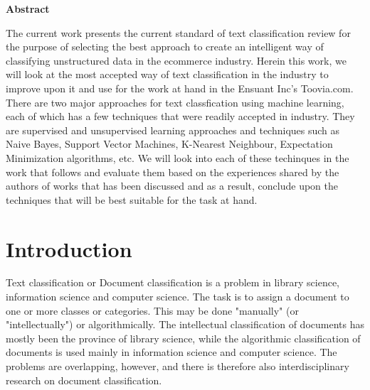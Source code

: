 \documentclass[12pt]{book}
\begin{document}
\begin{center}
  \vspace{30mm}
  \fontsize{24}{60}\selectfont \textbf{Abstract}\\
  \vspace{20mm}

	\fontsize{12}{20}\selectfont \raggedright{The current work presents the current standard of text classification review for the purpose of selecting the best approach to create an intelligent way of classifying unstructured data in the ecommerce industry.
	Herein this work, we will look at the most accepted way of text classification in the industry to improve upon it and use for the work at hand in the Ensuant Inc's Toovia.com. }
	\vspace{10mm}
	There are two major approaches for text classfication using machine learning, each of which has a few techniques that were readily accepted in industry. They are supervised and unsupervised learning approaches and techniques such as Naive Bayes, Support Vector Machines, K-Nearest Neighbour, Expectation Minimization algorithms, etc. 
	\vspace{10mm}
	We will look into  each of these techinques in the work that follows and evaluate them based on the experiences shared by the authors of works that has been discussed and as a result, conclude upon the techniques that will be best suitable for the task at hand.

\end{center}

\tableofcontents


\listoffigures

\listoftables

\clearpage


\chapter{Introduction}

Text classification or Document classification is a problem in library science, information science and computer science. The task is to assign a document to one or more classes or categories. This may be done "manually" (or "intellectually") or algorithmically. The intellectual classification of documents has mostly been the province of library science, while the algorithmic classification of documents is used mainly in information science and computer science. The problems are overlapping, however, and there is therefore also interdisciplinary research on document classification.
\end{document}
